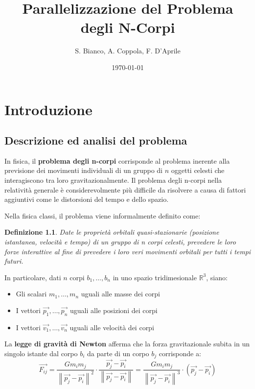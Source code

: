 \documentclass[12pt]{report}
\newcommand{\norm}[1]{\left\|#1\right\|}
\renewcommand\vec{\overrightarrow}
\newtheorem{definition}{Definizione}
\begin{document}
    \title{Parallelizzazione del Problema degli N-Corpi}
    \author{S. Bianco, A. Coppola, F. D'Aprile}
    \date{\today}

    \maketitle
    \tableofcontents
    \newpage

    \chapter{Introduzione}

    \section{Descrizione ed analisi del problema}

    In fisica, il \textbf{problema degli n-corpi} corrisponde al problema inerente alla previsione dei movimenti individuali di un gruppo di $n$ oggetti celesti che interagiscono tra loro gravitazionalmente. Il problema degli n-corpi nella relatività generale è considerevolmente più difficile da risolvere a causa di fattori aggiuntivi come le distorsioni del tempo e dello spazio.
    
    Nella fisica classi, il problema viene informalmente definito come:
    \begin{definition}
        Date le proprietà orbitali quasi-stazionarie (posizione istantanea, velocità e tempo) di un gruppo di n corpi celesti, prevedere le loro forze interattive al fine di prevedere i loro veri movimenti orbitali per tutti i tempi futuri.
    \end{definition}

    In particolare, dati $n$ corpi $b_1, \ldots, b_n$ in uno spazio tridimesionale $\mathbb{R}^3$, siano:
    \begin{itemize}
        \item Gli scalari $m_1, \ldots, m_n$ uguali alle masse dei corpi
        \item I vettori $\vec{p_1}, \ldots, \vec{p_n}$ uguali alle posizioni dei corpi
        \item I vettori $\vec{v_1}, \ldots, \vec{v_n}$ uguali alle velocità dei corpi
    \end{itemize}

    \newpage

    La \textbf{legge di gravità di Newton} afferma che la forza gravitazionale subita in un singolo istante dal corpo $b_i$ da parte di un corpo $b_j$ corrisponde a:
    \[\vec{F_{ij}} = \frac{G m_i m_j}{\norm{\vec{p_j}-\vec{p_i}}^2} \cdot \frac{\vec{p_j}-\vec{p_i}}{\norm{\vec{p_j}-\vec{p_i}}} = \frac{G m_i m_j}{\norm{\vec{p_j}-\vec{p_i}}^3} \cdot (\vec{p_j}-\vec{p_i})\]
\end{document}
